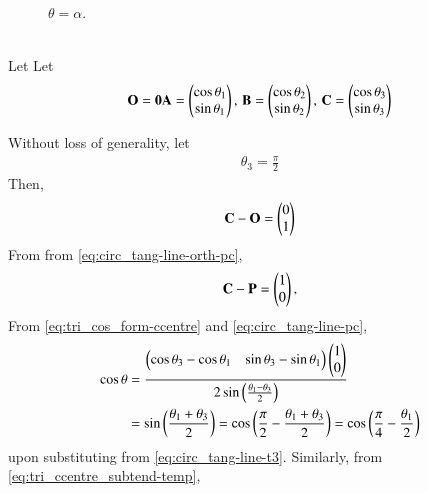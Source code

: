 \begin{enumerate}[label=\thesection.\arabic*.,ref=\thesection.\theenumi]
\begin{figure}[!ht]
\begin{center}
			\resizebox{0.6\columnwidth}{!}{}
		\end{center}
		\caption{$\theta= \alpha$.}
		\label{fig:circ_tang_icept}	
	\end{figure}
	\\
	\solution
	Let 
    Let
  \begin{align}
	  \mathbf{O} = \mathbf{0}
	  \mathbf{A} = \begin{pmatrix}\cos \theta_1 \\ \sin \theta_1\end{pmatrix},\,
	  \mathbf{B} =  \begin{pmatrix}\cos \theta_2 \\ \sin \theta_2\end{pmatrix},\,
	  \mathbf{C} =  \begin{pmatrix}\cos \theta_3 \\ \sin \theta_3\end{pmatrix}
  \end{align}
  \iffalse
  From 
\eqref{eq:tri_ccentre_subtend-temp}
  \begin{align}
	  \cos \alpha = \cos\brak{ \frac{\theta_1-\theta_3}{2}  }
		\label{eq:circ_tang-line-alpha}	
  \end{align}
  \fi
  Without loss of generality,  let 
  \begin{align}
	  \theta_3 = \frac{\pi}{2}
		\label{eq:circ_tang-line-t3}	
  \end{align}
  Then, 
  \begin{align}
	  \mathbf{C}-\mathbf{O} = \begin{pmatrix}0 \\ 1\end{pmatrix}
  \end{align}
  From 
		from \eqref{eq:circ_tang-line-orth-pc},	
  \begin{align}
	  \mathbf{C}-\mathbf{P} = \begin{pmatrix}1 \\ 0\end{pmatrix}
		\label{eq:circ_tang-line-pc},	
  \end{align}
From   
\eqref{eq:tri_cos_form-ccentre}
and 
		\eqref{eq:circ_tang-line-pc},	
  \begin{align}
	  \cos \theta &= \frac{
		  \begin{pmatrix}\cos \theta_3-\cos \theta_1 & \sin \theta_3-\sin \theta_1\end{pmatrix}
		  \begin{pmatrix}1 \\ 0\end{pmatrix}
		  }
		  {
	   2 \sin \left(\frac{\theta_1-\theta_3}{2}\right)
			  } 
			  \\
			  &=
	    \sin \left(\frac{\theta_1+\theta_3}{2}\right)
	    =\cos\left(\frac{\pi}{2}-\frac{\theta_1+\theta_3}{2}\right)
	    =\cos\left(\frac{\pi}{4}-\frac{\theta_1}{2}\right)
  \end{align}
  upon substituting from 
		\eqref{eq:circ_tang-line-t3}.  Similarly, 	
		from
\eqref{eq:tri_ccentre_subtend-temp},
  \begin{align}

\end{align}
\end{enumerate}
